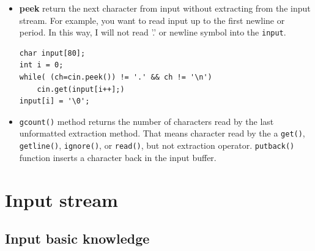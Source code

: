 \documentclass[a4paper,11pt,twoside]{book}
\begin{document}

\begin{itemize}
	\item \textbf{peek} return the next character from input without extracting from the input stream. For example, you want to read input up to the first newline or period. In this way, I will not read '.' or newline symbol into the \texttt{input}.
\begin{lstlisting}[numbers=none]
char input[80];
int i = 0;
while( (ch=cin.peek()) != '.' && ch != '\n')
	cin.get(input[i++];)
input[i] = '\0';
\end{lstlisting}
	
	\item \texttt{gcount()} method returns the number of characters read by the last unformatted extraction method. That means character read by the a \texttt{get()}, \texttt{getline()}, \texttt{ignore()}, or \texttt{read()}, but not extraction operator. \texttt{putback()} function inserts a character back in the input buffer.
\end{itemize}



\section{Input stream}

\subsection{Input basic knowledge}
\end{document}
